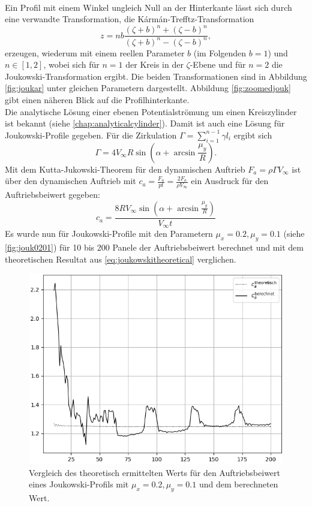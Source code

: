 \\
Ein Profil mit einem Winkel ungleich Null an der Hinterkante lässt sich durch eine verwandte Transformation, die Kármán-Trefftz-Transformation
\begin{equation}
z=nb{\frac {(\zeta +b)^{n}+(\zeta -b)^{n}}{(\zeta +b)^{n}-(\zeta -b)^{n}}},
\end{equation}
erzeugen, wiederum mit einem reellen Parameter $b$ (im Folgenden $b=1$) und $n \in [1,2]$, wobei sich für $n=1$ der Kreis in der $\zeta$-Ebene und für $n=2$ die Joukowski-Transformation ergibt. Die beiden Transformationen sind in Abbildung \ref{fig:joukar} unter gleichen Parametern dargestellt. Abbildung \ref{fig:zoomedjouk} gibt einen näheren Blick auf die Profilhinterkante. \\
Die analytische Lösung einer ebenen Potentialströmung um einen Kreiszylinder ist bekannt (siehe \ref{chap:analyticalcylinder}). Damit ist auch eine Lösung für Joukowski-Profile gegeben. Für die Zirkulation $\Gamma = \sum_{i=1}^{n-1} \gamma l_i$ ergibt sich
\begin{equation}
\Gamma = 4  V_{\infty}R \sin{\left(\alpha + \arcsin \frac{\mu_y}{R} \right)}.
\end{equation}
Mit dem Kutta-Jukowski-Theorem für den dynamischen Auftrieb $F_a = \rho \Gamma V_{\infty}$ ist über den dynamischen Auftrieb mit $c_a = \tfrac{F_a}{pt} = \tfrac{2F_a}{\rho V_{\infty}}$ ein Ausdruck für den Auftriebsbeiwert gegeben:
\begin{equation}
\label{eq:joukowskitheoretical}
c_a = \frac{8  R V_{\infty} \sin{\left(\alpha + \arcsin \frac{\mu_y}{R} \right)}}{V_{\infty}t}
\end{equation} 
Es wurde nun für Joukowski-Profile mit den Parametern $\mu_x = 0.2, \mu_y =0.1$ (siehe \ref{fig:jouk0201}) für 10 bis 200 Panele der Auftriebsbeiwert berechnet und mit dem theoretischen Resultat aus \eqref{eq:joukowskitheoretical} verglichen. 
\begin{figure}[!ht]
\begin{center} \includegraphics[scale=0.5]{figures/joukowskierror.png} \end{center}
\caption{Vergleich des theoretisch ermittelten Werts für den Auftriebsbeiwert eines Joukowski-Profils mit $\mu_x = 0.2, \mu_y =0.1$ und dem berechneten Wert.}
\label{fig:joukowskitheoretical}
\end{figure}

